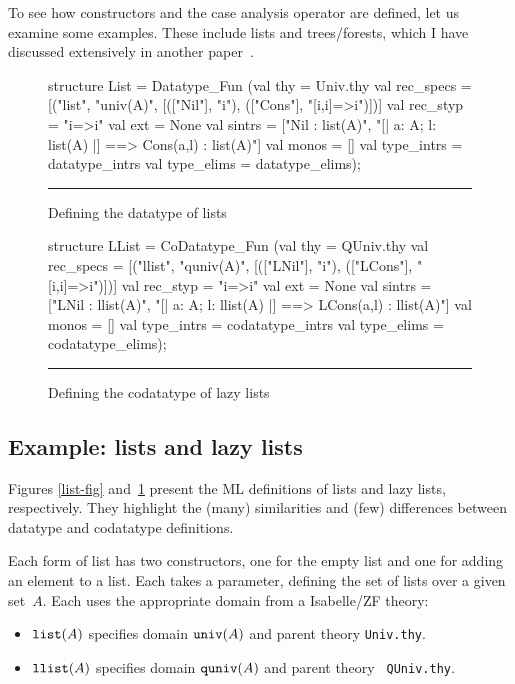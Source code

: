 To see how constructors and the case analysis operator are defined, let us
examine some examples.  These include lists and trees/forests, which I have
discussed extensively in another paper~\cite{paulson-set-II}.

\begin{figure}
\begin{ttbox} 
structure List = Datatype_Fun
 (val thy        = Univ.thy
  val rec_specs  = [("list", "univ(A)",
                      [(["Nil"],    "i"), 
                       (["Cons"],   "[i,i]=>i")])]
  val rec_styp   = "i=>i"
  val ext        = None
  val sintrs     = ["Nil : list(A)",
                    "[| a: A;  l: list(A) |] ==> Cons(a,l) : list(A)"]
  val monos      = []
  val type_intrs = datatype_intrs
  val type_elims = datatype_elims);
\end{ttbox}
\hrule
\caption{Defining the datatype of lists} \label{list-fig}

\medskip
\begin{ttbox}
structure LList = CoDatatype_Fun
 (val thy        = QUniv.thy
  val rec_specs  = [("llist", "quniv(A)",
                      [(["LNil"],   "i"), 
                       (["LCons"],  "[i,i]=>i")])]
  val rec_styp   = "i=>i"
  val ext        = None
  val sintrs     = ["LNil : llist(A)",
                    "[| a: A;  l: llist(A) |] ==> LCons(a,l) : llist(A)"]
  val monos      = []
  val type_intrs = codatatype_intrs
  val type_elims = codatatype_elims);
\end{ttbox}
\hrule
\caption{Defining the codatatype of lazy lists} \label{llist-fig}
\end{figure}

\subsection{Example: lists and lazy lists}
Figures \ref{list-fig} and~\ref{llist-fig} present the ML definitions of
lists and lazy lists, respectively.  They highlight the (many) similarities
and (few) differences between datatype and codatatype definitions.

Each form of list has two constructors, one for the empty list and one for
adding an element to a list.  Each takes a parameter, defining the set of
lists over a given set~$A$.  Each uses the appropriate domain from a
Isabelle/ZF theory:
\begin{itemize}
\item $\hbox{\tt list}(A)$ specifies domain $\hbox{\tt univ}(A)$ and parent theory {\tt Univ.thy}.

\item $\hbox{\tt llist}(A)$ specifies domain $\hbox{\tt quniv}(A)$ and parent theory {\tt
QUniv.thy}.
\end{itemize}

